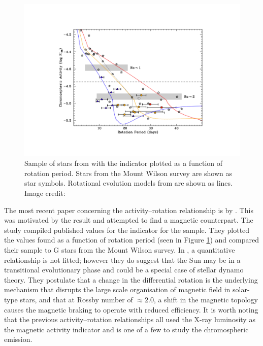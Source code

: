 \begin{figure}
    \centering
    \includegraphics[scale=0.5]{Figures/2-Historical_overview/metcalfe_etal_2016_fig1.pdf}
    \caption[Chromospheric emission as a function of rotation period for sample of older stars]{Sample of stars from \citet{Metcalfe_etal_2016} with the \Rprime indicator plotted as a function of rotation period. Stars from the Mount Wilson survey are shown as star symbols. Rotational evolution models from \citet{van_Saders_etal_2016} are shown as lines. Image credit: \citet{Metcalfe_etal_2016}}
    \label{fig:metcalfe_etal_2016_plot}
\end{figure}

The most recent paper concerning the activity--rotation relationship is by \citet{Metcalfe_etal_2016}. This was motivated by the \citet{van_Saders_etal_2016} result and attempted to find a magnetic counterpart. The study compiled published values for the \Rprime indicator for the \citet{van_Saders_etal_2016} sample. They plotted the values found as a function of rotation period (seen in Figure \ref{fig:metcalfe_etal_2016_plot}) and compared their sample to G stars from the Mount Wilson survey. In \citet{Metcalfe_etal_2016}, a quantitative relationship is not fitted; however they do suggest that the Sun may be in a transitional evolutionary phase and could be a special case of stellar dynamo theory. They postulate that a change in the differential rotation is the underlying mechanism that disrupts the large scale organisation of magnetic field in solar-type stars, and that at Rossby number of $\approx 2.0$, a shift in the magnetic topology causes the magnetic braking to operate with reduced efficiency. It is worth noting that the previous activity--rotation relationships all used the X-ray luminosity as the magnetic activity indicator and \citet{Metcalfe_etal_2016} is one of a few to study the chromospheric emission.

